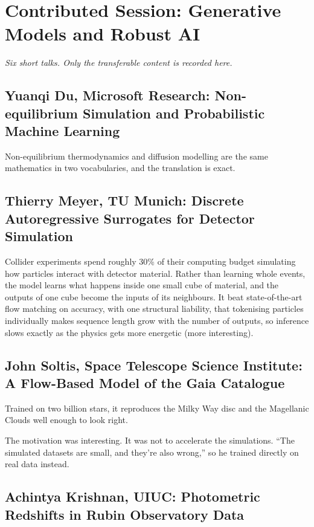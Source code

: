 \documentclass[11pt]{article}
\begin{document}
\section{Contributed Session: Generative Models and Robust AI}

\emph{Six short talks. Only the transferable content is recorded here.}

\subsection*{Yuanqi Du, Microsoft Research: Non-equilibrium Simulation and Probabilistic Machine Learning}

Non-equilibrium thermodynamics and diffusion modelling are the same mathematics in two vocabularies, and the translation is exact.

\subsection*{Thierry Meyer, TU Munich: Discrete Autoregressive Surrogates for Detector Simulation}

Collider experiments spend roughly 30\% of their computing budget simulating how particles interact with detector material. Rather than learning whole events, the model learns what happens inside one small cube of material, and the outputs of one cube become the inputs of its neighbours. It beat state-of-the-art flow matching on accuracy, with one structural liability, that tokenising particles individually makes sequence length grow with the number of outputs, so inference slows exactly as the physics gets more energetic (more interesting).

\subsection*{John Soltis, Space Telescope Science Institute: A Flow-Based Model of the Gaia Catalogue}

Trained on two billion stars, it reproduces the Milky Way disc and the Magellanic Clouds well enough to look right.

The motivation was interesting. It was not to accelerate the simulations. ``The simulated datasets are small, and they're also wrong,'' so he trained directly on real data instead.

\subsection*{Achintya Krishnan, UIUC: Photometric Redshifts in Rubin Observatory Data}
\end{document}
